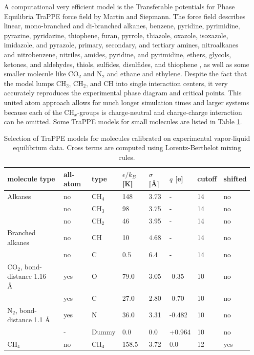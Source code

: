 A computational very efficient model is the Transferable potentials for Phase Equilibria  TraPPE force field by Martin and Siepmann\cite{Martin1998,Martin1999}.
The force field describes linear, mono-branched and di-branched alkanes\cite{Martin1998,Martin1999},
benzene, pyridine, pyrimidine, pyrazine, pyridazine, thiophene, furan, pyrrole, thiazole, oxazole, isoxazole, imidazole, and pyrazole\cite{Rai2007},
primary, secondary, and tertiary amines, nitroalkanes and nitrobenzene, nitriles, amides, pyridine, and pyrimidine\cite{Wick2005a},
ethers, glycols, ketones, and aldehydes\cite{Stubbs2004},
thiols, sulfides, disulfides, and thiophene \cite{Lubna2005}, as well as some smaller molecule
like CO$_2$ and N$_2$ \cite{Potoff2001} and ethane and ethylene\cite{Shah2017}.
Despite the fact that the model lumps CH$_3$, CH$_2$, and CH into single interaction centers, it very accurately
reproduces the experimental phase diagram and critical points.
This united atom approach allows for much longer simulation times and larger systems because each of the CH$_x$-groups is
charge-neutral and charge-charge interaction can be omitted.
Some TraPPE models for small molecules are listed in Table \ref{Table: TraPPE VLE calibrated LJ}.

\begin{table}[H]
\begin{tabular}{p{5.5cm}|p{1.5cm}|p{1.3cm}|p{1.3cm}|p{1.0cm}|p{1.15cm}|p{1.0cm}|p{1.0cm}}
molecule type &  all-atom & type & $\epsilon/k_B$ [K] & $\sigma$ [\AA] & $q$ [e] & cutoff & shifted\\
\hline
\hline
Alkanes \cite{Martin1998} & no  & CH$_4$ & 148 & 3.73 & - & 14 & no\\
                         & no  & CH$_3$ & 98 & 3.75 & - & 14 & no\\
                         & no  & CH$_2$ & 46 & 3.95 & - & 14 & no\\
\hline
Branched alkanes\cite {Martin1999} & no  & CH & 10 & 4.68 & - & 14 & no\\
                                  & no  & C & 0.5 & 6.4 & - & 14 & no\\
\hline
CO$_2$, bond-distance 1.16 \AA\ \cite{Potoff2001} & yes  & O     & 79.0 & 3.05 & -0.35 & 10 & no\\
                                                   & yes  & C     & 27.0 & 2.80 & -0.70 & 10 & no\\
\hline
N$_2$, bond-distance 1.1 \AA\ \cite{Potoff2001} & yes  & N     & 36.0 & 3.31 & -0.482 & 10 & no\\
                                                & -    & Dummy & 0.0 & 0.0 & +0.964 & 10 & no\\
\hline
CH$_4$ \cite{Martin2001} & no  & CH$_4$ & 158.5 & 3.72 & 0.0 & 12 & yes\\
\end{tabular}
\caption{Selection of TraPPE models for molecules calibrated on experimental vapor-liquid equilibrium data.
 Cross terms are computed using Lorentz-Berthelot mixing rules.}
\label{Table: TraPPE VLE calibrated LJ}
\end{table}

